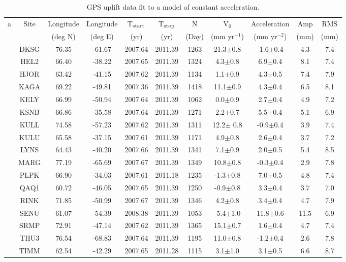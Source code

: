\clearpage
\begin{table}[h!]
\centering
\caption{GPS uplift data fit to a model of constant acceleration.}
\begin{adjustbox}{width=1\textwidth}
\begin{threeparttable}
\begin{tabular}{ccccccccccc}
\midrule
a & Site & Longitude & Longitude & T$_{\textup{start}}$ & T$_{\textup{stop}}$ & N & V$_{0}$ & Acceleration & Amp &RMS\\
  &      & (deg N)   & (deg E)   & (yr)   & (yr)  & (Day) & (mm yr$^{-1}$) & (mm yr$^{-2}$) & (mm) & (mm)\\
\midrule
&DKSG & 76.35 & -61.67 & 2007.64 & 2011.39 & 1263 & 21.3$\pm$0.8 & -1.6$\pm$0.4 & 4.3 & 7.4\\
&HEL2&66.40&-38.22&2007.65&2011.39&1324&4.3$\pm$0.8&6.9$\pm$0.4&8.1&7.4\\
&HJOR&63.42&-41.15&2007.62&2011.39&1134&1.1$\pm$0.9&4.3$\pm$0.5&7.4&7.9\\
&KAGA&69.22&-49.81&2007.36&2011.39&1418&11.1$\pm$0.9&4.3$\pm$0.4&6.5&8.1\\
&KELY&66.99&-50.94&2007.64&2011.39&1062&0.0$\pm$0.9&2.7$\pm$0.4&4.9&7.2\\
&KSNB&66.86&-35.58&2007.64&2011.39&1271&2.2$\pm$0.7&5.5$\pm$0.4&5.1&6.9\\
&KULL&74.58&-57.23&2007.62&2011.39&1311&12.2$\pm$ 0.8&-0.9$\pm$0.4&3.9&7.4\\
&KULU&65.58&-37.15&2007.61&2011.39&1171&4.9$\pm$0.8&2.6$\pm$0.4&3.7&7.2\\
&LYNS&64.43&-40.20&2007.66&2011.39&1341&7.1$\pm$0.9&2.0$\pm$0.5&5.4&8.5\\
&MARG&77.19&-65.69&2007.67&2011.39&1349&10.8$\pm$0.8&-0.3$\pm$0.4&2.9&7.8\\
&PLPK&66.90&-34.03&2007.61&2011.18&1235&-1.3$\pm$0.8&7.0$\pm$0.5&4.8&7.4\\
&QAQ1&60.72&-46.05&2007.65&2011.39&1250&-0.9$\pm$0.8&3.3$\pm$0.4&3.7&7.0\\
&RINK&71.85&-50.99&2007.67&2011.39&1346&4.2$\pm$0.8&3.4$\pm$0.4&4.7&7.9\\
&SENU&61.07&-54.39&2008.38&2011.39&1053&-5.4$\pm$1.0&11.8$\pm$0.6&11.5&6.9\\
&SRMP&72.91&-47.14&2007.62&2011.39&1365&15.1$\pm$0.7&1.6$\pm$0.4&4.7&7.4\\
&THU3&76.54&-68.83&2007.64&2011.39&1195&11.0$\pm$0.8&-1.2$\pm$0.4&2.6&7.8\\
&TIMM&62.54&-42.29&2007.65&2011.28&1115&3.1$\pm$1.0&3.1$\pm$0.5&6.6&8.7\\

\end{tabular}
\end{threeparttable}
\end{adjustbox}
\end{table}
